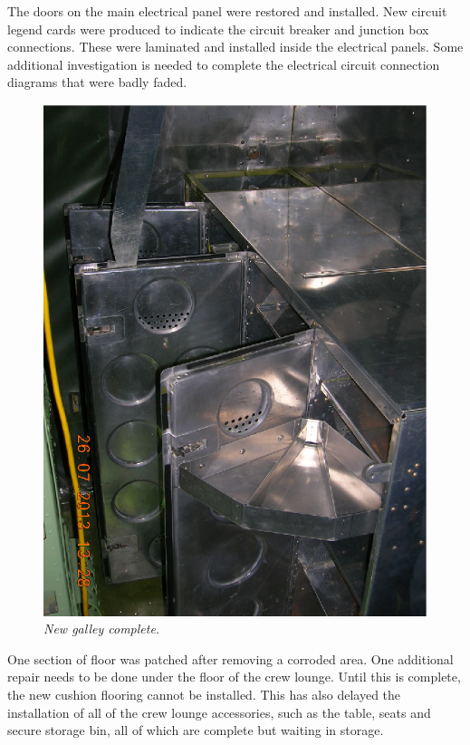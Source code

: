 The doors on the main electrical panel were restored and installed.
New circuit legend cards were produced to indicate the circuit breaker
and junction box connections.  These were laminated and installed
inside the electrical panels.  Some additional investigation is needed
to complete the electrical circuit connection diagrams that were badly
faded.

\begin{figure}[htbp]
   \vspace{2em}
   \centering
   \includegraphics[scale=0.5]{galley_interior.eps}
   \caption*{\small \em New galley complete.}
   \label{fig:galley_interior}
\end{figure}

One section of floor was patched after removing a corroded area.  One
additional repair needs to be done under the floor of the crew lounge.
Until this is complete, the new cushion flooring cannot be
installed. This has also delayed the installation of all of the crew
lounge accessories, such as the table, seats and secure storage bin,
all of which are complete but waiting in storage.


